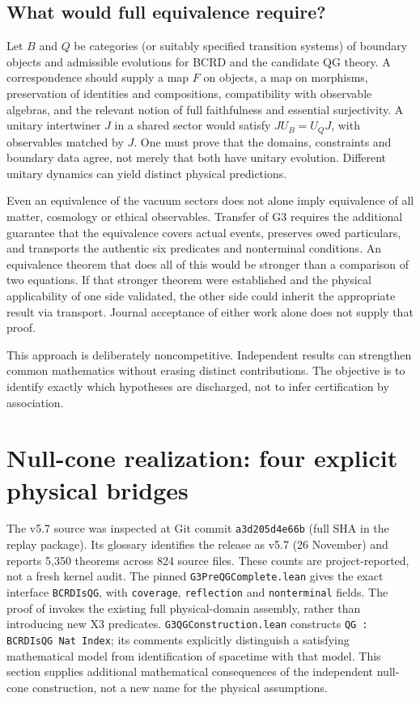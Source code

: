 \documentclass[11pt,a4paper]{article}
\begin{document}
\subsection{What would full equivalence require?}
Let $B$ and $Q$ be categories (or suitably specified transition systems) of boundary objects and admissible evolutions for BCRD and the candidate QG theory. A correspondence should supply a map $F$ on objects, a map on morphisms, preservation of identities and compositions, compatibility with observable algebras, and the relevant notion of full faithfulness and essential surjectivity. A unitary intertwiner $J$ in a shared sector would satisfy $J U_B=U_Q J$, with observables matched by $J$. One must prove that the domains, constraints and boundary data agree, not merely that both have unitary evolution. Different unitary dynamics can yield distinct physical predictions.

Even an equivalence of the vacuum sectors does not alone imply equivalence of all matter, cosmology or ethical observables. Transfer of G3 requires the additional guarantee that the equivalence covers actual events, preserves owed particulars, and transports the authentic six predicates and nonterminal conditions. An equivalence theorem that does all of this would be stronger than a comparison of two equations. If that stronger theorem were established and the physical applicability of one side validated, the other side could inherit the appropriate result via transport. Journal acceptance of either work alone does not supply that proof.

This approach is deliberately noncompetitive. Independent results can strengthen common mathematics without erasing distinct contributions. The objective is to identify exactly which hypotheses are discharged, not to infer certification by association.
\section{Null-cone realization: four explicit physical bridges}\label{sec:newbridges}
The v5.7 source was inspected at Git commit
\texttt{a3d205d4e66b} (full SHA in the replay package). Its glossary identifies the release as v5.7 (26 November) and reports 5,350 theorems across 824 source files. These counts are project-reported, not a fresh kernel audit. The pinned \texttt{G3PreQGComplete.lean} gives the exact interface \texttt{BCRDIsQG}, with \texttt{coverage}, \texttt{reflection} and \texttt{nonterminal} fields. The proof of  invokes the existing full physical-domain assembly, rather than introducing new X3 predicates. \texttt{G3QGConstruction.lean} constructs \texttt{QG : BCRDIsQG Nat Index}; its comments explicitly distinguish a satisfying mathematical model from identification of spacetime with that model. This section supplies additional mathematical consequences of the independent null-cone construction, not a new name for the physical assumptions.
\end{document}
